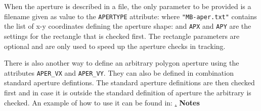 When the aperture is described in a file, the only parameter to be provided is 
a filename given as value to the \texttt{APERTYPE} attribute:
where \texttt{"MB-aper.txt"} contains the list of x-y coordinates defining the
aperture shape:
and \texttt{APX} and \texttt{APY} are the settings for the rectangle 
that is checked first. The rectangle parameters are optional and are 
only used to speed up the aperture checks in tracking.

There is also another way to define an arbitrary polygon aperture using 
the attributes \texttt{APER\_VX} and \texttt{APER\_VY}. They can also be
defined in combination standard aperture defintions. The standard
aperture definitions are then checked first and in case it is outside
the standard definition of aperture the arbitrary is checked. An example
of how to use it can be found in: 
\href{https://github.com/MethodicalAcceleratorDesign/MAD-X/blob/master/tests/test-track-13/test-track-13.madx}. 
\textbf{Notes}
